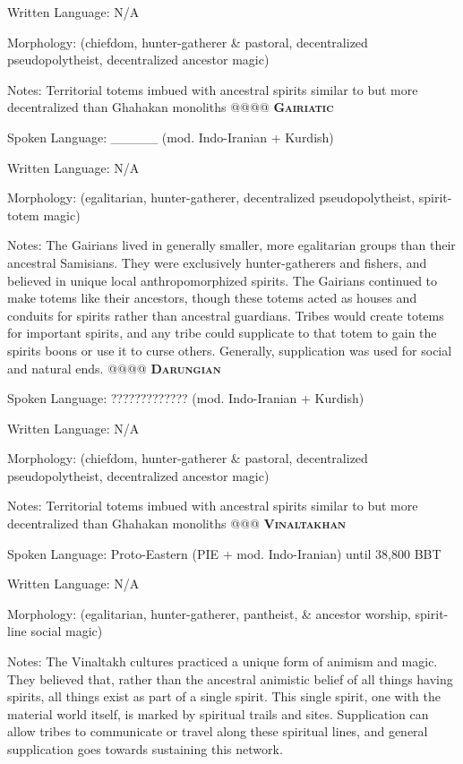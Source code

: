 \documentclass[12pt]{article}
\begin{document}
\begin{easylist}
	Written Language: N/A
	
	Morphology: (chiefdom, hunter-gatherer \& pastoral, decentralized pseudopolytheist, decentralized ancestor magic)
	
	{\footnotesize Notes: Territorial totems imbued with ancestral spirits similar to but more decentralized than Ghahakan monoliths}
	@@@@ \textsc{\textbf{Gairiatic}}
	
	\normalfont Spoken Language: \_\_\_\_\_ (mod. Indo-Iranian + Kurdish)
	
	Written Language: N/A
	
	Morphology: (egalitarian, hunter-gatherer, decentralized pseudopolytheist, spirit-totem magic)
	
	{\footnotesize Notes: The Gairians lived in generally smaller, more egalitarian groups than their ancestral Samisians. They were exclusively hunter-gatherers and fishers, and believed in unique local anthropomorphized spirits. The Gairians continued to make totems like their ancestors, though these totems acted as houses and conduits for spirits rather than ancestral guardians. Tribes would create totems for important spirits, and any tribe could supplicate to that totem to gain the spirits boons or use it to curse others. Generally, supplication was used for social and natural ends.}
	@@@@ \textsc{\textbf{Darungian}}
	
	\normalfont Spoken Language: ????????????? (mod. Indo-Iranian + Kurdish)
	
	Written Language: N/A
	
	Morphology: (chiefdom, hunter-gatherer \& pastoral, decentralized pseudopolytheist, decentralized ancestor magic)
	
	{\footnotesize Notes: Territorial totems imbued with ancestral spirits similar to but more decentralized than Ghahakan monoliths}
	@@@ \textsc{\textbf{Vinaltakhan}}
	
	\normalfont Spoken Language: Proto-Eastern (PIE + mod. Indo-Iranian) until 38,800 BBT
	
	Written Language: N/A
	
	Morphology: (egalitarian, hunter-gatherer, pantheist, \& ancestor worship, spirit-line social magic)
	
	{\footnotesize Notes: The Vinaltakh cultures practiced a unique form of animism and magic. They believed that, rather than the ancestral animistic belief of all things having spirits, all things exist as part of a single spirit. This single spirit, one with the material world itself, is marked by spiritual trails and sites. Supplication can allow tribes to communicate or travel along these spiritual lines, and general supplication goes towards sustaining this network.}
\end{easylist}
\end{document}
